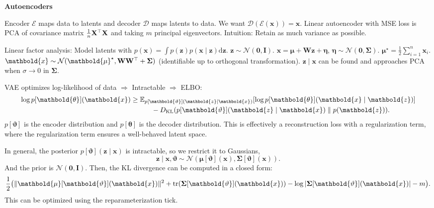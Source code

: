 \documentclass[10pt]{article}
\newenvironment{topic}[1]
{\textbf{\sffamily \footnotesize \colorbox{black}{\rlap{\textbf{\textcolor{white}{#1}}}\hspace{\linewidth}\hspace{-2\fboxsep}}}}
{}
\newenvironment{subtopic}[1]
{\begin{center}\textbf{\footnotesize \sffamily #1}\end{center}}
{}
\renewcommand{\det}[1]{|#1|}
\renewcommand{\mat}[1]{\ensuremath{\mathbf{#1}}}
\renewcommand{\vec}[1]{\ensuremath{\mathbold{#1}}}
\begin{document}
\begin{multicols*}{3}
\begin{topic}{Statistical learning theory}
    \end{topic}

    \begin{topic}{Generative models}

        \begin{subtopic}{Autoencoders}
            Encoder $\bm{\mathcal{E}}$ maps data to latents and decoder $\bm{\mathcal{D}}$ maps
            latents to data. We want $\bm{\mathcal{D}}(\bm{\mathcal{E}}(\vec{x})) = \vec{x}$. Linear
            autoencoder with MSE loss is PCA of covariance matrix $\frac{1}{n} \transpose{\mat{X}}
                \mat{X}$ and taking $m$ principal eigenvectors. Intuition: Retain as much variance as possible.

            Linear factor analysis: Model latents with $p(\vec{x}) = \int p(\vec{z})
                p(\vec{x}\mid \vec{z}) \mathrm{d}\vec{z}$. $\vec{z} \sim \mathcal{N}(\vec{0},
                \mat{I})$. $\vec{x} = \vec{\mu} + \mat{W} \vec{z} + \vec{\eta}$, $\vec{\eta} \sim
                \mathcal{N}(\vec{0}, \mat{\Sigma})$. $\vec{\mu}^\star = \frac{1}{2} \sum_{i=1}^{n}
                \vec{x}_i$. $\vec{x} \sim \mathcal{N}(\vec{\mu}^\star, \mat{W} \transpose{\mat{W}}
                + \mat{\Sigma})$ (identifiable up to orthogonal transformation). $\vec{z} \mid \vec{x}$
                can be found and approaches PCA when $\sigma \to 0$ in $\mat{\Sigma}$.

            VAE optimizes log-likelihood of data $\Rightarrow$ Intractable $\Rightarrow$ ELBO:
            \begin{align*}
                \log p[\vec{\theta}](\vec{x}) & \geq \E_{p[\vec{\vartheta}](\vec{z} \mid \vec{x})} [\log p[\vec{\theta}](\vec{x} \mid \vec{z})] \\
                                              & \quad \quad \quad - D_{\mathrm{KL}}(p[\vec{\vartheta}](\vec{z} \mid \vec{x}) \;\|\; p(\vec{z})).
            \end{align*}
            $p[\vec{\vartheta}]$ is the encoder distribution and $p[\vec{\theta}]$ is the decoder
            distribution. This is effectively a reconstruction loss with a regularization term, where
            the regularization term ensures a well-behaved latent space.

            In general, the posterior $p[\vec{\vartheta}](\vec{z} \mid \vec{x})$ is intractable, so we restrict
            it to Gaussians, \[
                \vec{z} \mid \vec{x}, \vec{\vartheta} \sim \mathcal{N}(\vec{\mu}[\vec{\vartheta}](\vec{x}), \mat{\Sigma}[\vec{\vartheta}](\vec{x})).
            \]
            And the prior is $\mathcal{N}(\vec{0}, \mat{I})$. Then, the KL divergence can be computed in a
            closed form: \[
                \frac{1}{2} \lft( \| \vec{\mu}[\vec{\vartheta}](\vec{x}) \|^2 + \tr{\mat{\Sigma}[\vec{\vartheta}](\vec{x})} - \log \det{\mat{\Sigma}[\vec{\vartheta}](\vec{x})} - m \rgt).
            \]
            This can be optimized using the reparameterization tick.
        \end{subtopic}


\end{topic}
\end{multicols*}
\end{document}
